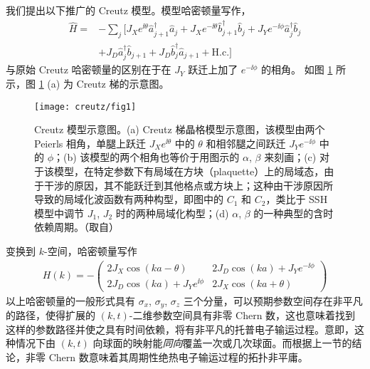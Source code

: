 我们提出以下推广的 Creutz 模型。模型哈密顿量写作，
\begin{align}
\hat{H} =&-\sum_{j} [J_X e^{\ii\theta} \hat{a}_{j+1}^\dag \hat{a}_{j}+J_X e^{-\ii\theta} \hat{b}_{j+1}^\dag \hat{b}_{j} + J_Y e^{-\ii\phi} \hat{a}_j^\dag \hat{b}_j 
\nonumber\\
&+ J_D \hat{a}_j^\dag \hat{b}_{j+1}+J_D \hat{b}_j^\dag \hat{a}_{j+1} +\textrm{H.c.}]
\end{align}
与原始 Creutz 哈密顿量的区别在于在 $J_Y$ 跃迁上加了 $e^{-\ii\phi}$ 的相角。
如图 \ref{fig:creutz:schematic} 所示，图 \ref{fig:creutz:schematic} (a) 为 Creutz 梯的示意图。
\begin{figure}[!htb]
\centering
\texttt{[image: creutz/fig1]}
\caption{Creutz 模型示意图。(a) Creutz 梯晶格模型示意图，该模型由两个 Peierls 相角，单腿上跃迁 $J_Xe^{\ii\theta}$ 中的 $\theta$ 和相邻腿之间跃迁 $J_Ye^{-\ii\phi}$ 中的 $\phi$；(b) 该模型的两个相角也等价于用图示的 $\alpha$, $\beta$ 来刻画；(c) 对于该模型，在特定参数下有局域在方块（plaquette）上的局域态，由于干涉的原因，其不能跃迁到其他格点或方块上\cite{creutz,creutz1999}；这种由干涉原因所导致的局域化波函数有两种构型，即图中的 $C_1$ 和 $C_2$，类比于 SSH 模型中调节 $J_1$, $J_2$ 时的两种局域化构型；(d) $\alpha$, $\beta$ 的一种典型的含时依赖周期。（取自）}
\label{fig:creutz:schematic}
\end{figure}
变换到 $k$-空间，哈密顿量写作
\begin{align}
H(k)=-\begin{pmatrix} 2 J_X \cos(ka-\theta)& 2 J_D\cos(ka)+J_Y e^{-\ii\phi}\\
2 J_D\cos(ka)+J_Y e^{\ii\phi}& 2 J_X \cos(ka+\theta)\end{pmatrix}
\end{align}
以上哈密顿量的一般形式具有 $\sigma_x$, $\sigma_y$, $\sigma_z$ 三个分量，可以预期参数空间存在非平凡的路径，使得扩展的 $(k,t)$-二维参数空间具有非零 Chern 数，这也意味着找到这样的参数路径并使之具有时间依赖，将有非平凡的托普电子输运过程。意即，这种情况下由 $(k,t)$ 向球面的映射能\textit{同向}覆盖一次或几次球面。而根据上一节的结论，非零 Chern 数意味着其周期性绝热电子输运过程的拓扑非平庸。

